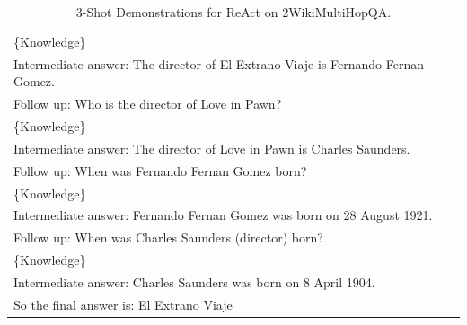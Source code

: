 \begin{table}[t!]
{\begin{tabular}{p{\textwidth}}
\{Knowledge\}\\
Intermediate answer: The director of El Extrano Viaje is Fernando Fernan Gomez.\\
Follow up: Who is the director of Love in Pawn?\\
\{Knowledge\}\\
Intermediate answer: The director of Love in Pawn is Charles Saunders.\\
Follow up: When was Fernando Fernan Gomez born?\\
\{Knowledge\}\\
Intermediate answer: Fernando Fernan Gomez was born on 28 August 1921.\\
Follow up: When was Charles Saunders (director) born?\\
\{Knowledge\}\\
Intermediate answer: Charles Saunders was born on 8 April 1904.\\
So the final answer is: El Extrano Viaje\\
\bottomrule
\end{tabular}
}
\caption{3-Shot Demonstrations for ReAct on 2WikiMultiHopQA.}\label{tab:2WikiMultiHopQA-react}
\end{table}
\endgroup

